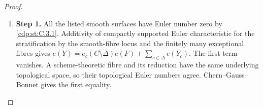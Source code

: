 \begin{proof}
\begin{enumerate}[label={$\langle1\rangle$\arabic*.},leftmargin=*]
\item 
\noindent\textbf{Step 1.} All the listed smooth surfaces have Euler number zero by \ref{cdp:st:C.3.1}.
Additivity of compactly supported Euler characteristic for the
stratification by the smooth-fibre locus and the finitely many
exceptional fibres gives
$e(Y)=e_c(C\setminus\Delta)e(F)+\sum_{c\in\Delta}e(Y_c)$.
The first term vanishes. A scheme-theoretic fibre and its reduction
have the same underlying topological space, so their topological
Euler numbers agree. Chern--Gauss--Bonnet gives the first equality.

\end{enumerate}
\end{proof}
